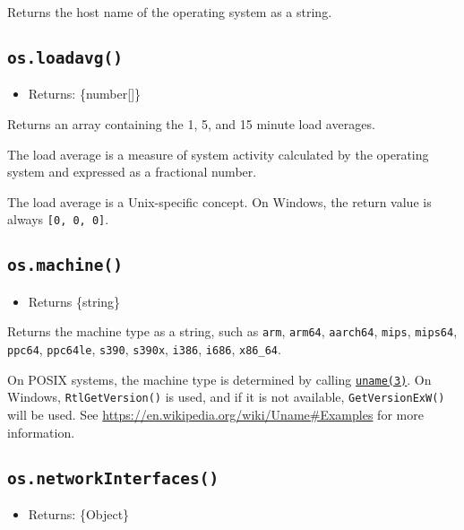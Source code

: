 Returns the host name of the operating system as a string.

\subsection{\texorpdfstring{\texttt{os.loadavg()}}{os.loadavg()}}\label{os.loadavg}

\begin{itemize}
\tightlist
\item
  Returns: \{number{[}{]}\}
\end{itemize}

Returns an array containing the 1, 5, and 15 minute load averages.

The load average is a measure of system activity calculated by the
operating system and expressed as a fractional number.

The load average is a Unix-specific concept. On Windows, the return
value is always \texttt{{[}0,\ 0,\ 0{]}}.

\subsection{\texorpdfstring{\texttt{os.machine()}}{os.machine()}}\label{os.machine}

\begin{itemize}
\tightlist
\item
  Returns \{string\}
\end{itemize}

Returns the machine type as a string, such as \texttt{arm},
\texttt{arm64}, \texttt{aarch64}, \texttt{mips}, \texttt{mips64},
\texttt{ppc64}, \texttt{ppc64le}, \texttt{s390}, \texttt{s390x},
\texttt{i386}, \texttt{i686}, \texttt{x86\_64}.

On POSIX systems, the machine type is determined by calling
\href{https://linux.die.net/man/3/uname}{\texttt{uname(3)}}. On Windows,
\texttt{RtlGetVersion()} is used, and if it is not available,
\texttt{GetVersionExW()} will be used. See
\url{https://en.wikipedia.org/wiki/Uname\#Examples} for more
information.

\subsection{\texorpdfstring{\texttt{os.networkInterfaces()}}{os.networkInterfaces()}}\label{os.networkinterfaces}

\begin{itemize}
\tightlist
\item
  Returns: \{Object\}
\end{itemize}

